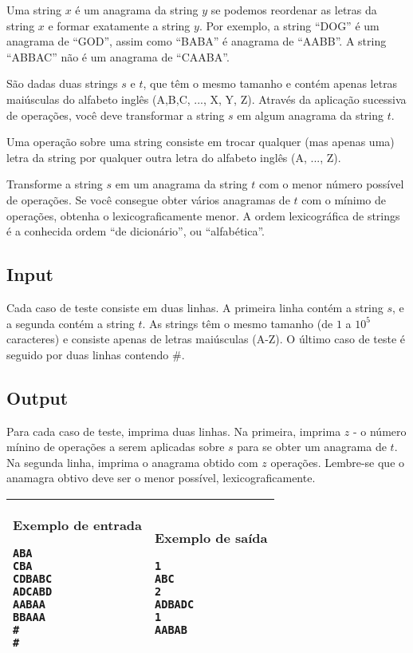 Uma string $x$ é um anagrama da string $y$ se podemos reordenar as letras da string
$x$ e formar exatamente a string $y$. Por exemplo, a string ``DOG'' é um anagrama de
``GOD'', assim como ``BABA'' é anagrama de ``AABB''. A string ``ABBAC'' não é um
anagrama de ``CAABA''.

São dadas duas strings $s$ e $t$, que têm o mesmo tamanho e contém apenas letras
maiúsculas do alfabeto inglês (A,B,C, ..., X, Y, Z). Através da aplicação
sucessiva
de operações, você deve transformar a string $s$ em algum anagrama da string $t$.

Uma operação sobre uma string consiste em trocar qualquer (mas apenas uma) letra da
string por qualquer outra letra do alfabeto inglês (A, ..., Z).

Transforme a string $s$ em um anagrama da string $t$ com o menor número possível de
operações. Se você consegue obter vários anagramas de $t$ com o mínimo de
operações, obtenha o lexicograficamente menor. A ordem lexicográfica de strings
é a conhecida ordem ``de dicionário'', ou ``alfabética''.

\subsection*{Input}

Cada caso de teste consiste em duas linhas. A primeira linha contém a string $s$,
e a segunda contém a string $t$. As strings têm o mesmo tamanho (de
$1$ a $10^5$ caracteres) e consiste apenas de letras maiúsculas (A-Z).
O último caso de teste é seguido por duas linhas contendo $\#$.

\subsection*{Output}

Para cada caso de teste, imprima duas linhas. Na primeira, imprima $z$ - o número
mínino de operações a serem aplicadas sobre $s$ para se obter um anagrama de $t$. Na
segunda linha, imprima o anagrama obtido com $z$ operações. Lembre-se que o
anamagra obtivo deve ser o menor possível, lexicograficamente.

\begin{table}[!h]
\centering
\begin{tabular}{|l|l|}
\hline
\begin{minipage}[t]{3in}
\textbf{Exemplo de entrada}
\begin{verbatim}
ABA
CBA
CDBABC
ADCABD
AABAA
BBAAA
#
#
\end{verbatim}
\vspace{1mm}
\end{minipage}
&

\begin{minipage}[t]{3in}
\textbf{Exemplo de saída}
\begin{verbatim}
1
ABC
2
ADBADC
1
AABAB
\end{verbatim}
\vspace{1mm}
\end{minipage} \\
\hline
\end{tabular}
\end{table}

\newpage
